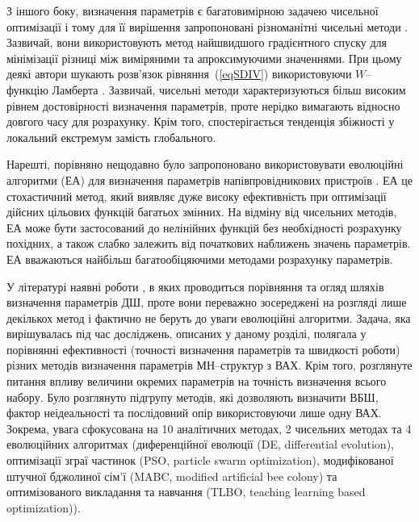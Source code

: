 З іншого боку, визначення параметрів є багатовимірною задачею чисельної оптимізації і тому для її вирішення запропоновані різноманітні чисельні методи \cite{Ortiz1999,Evangelou,Donoval,Ferhat}.
Зазвичай, вони використовують метод найшвидшого градієнтного спуску для мінімізації різниці між виміряними та апроксимуючими значеннями.
При цьому деякі автори\cite{Lambert_Jung,Ortiz2005} шукають розв'язок рівняння~(\ref{eqSDIV}) використовуючи $W$--функцію Ламберта
\cite{LambertBook}.
Зазвичай, чисельні методи характеризуються більш високим рівнем достовірності визначення параметрів, проте нерідко вимагають відносно довгого часу для розрахунку.
Крім того, спостерігається тенденція збіжності у локальний екстремум замість глобального.

Нарешті, порівняно нещодавно було запропоновано використовувати еволюційні алгоритми (ЕА) для визначення параметрів напівпровідникових пристроїв \cite{PSO_Ye,DEWang,GA_Li,P-DE_Ishaque,TLBO_Patel,MABC,PSOWang,GA_Schottky}.
ЕА це стохастичний метод, який виявляє дуже високу ефективність при оптимізації дійсних цільових функцій багатьох змінних.
На відміну від чисельних методів, ЕА може бути застосований до нелінійних функцій без необхідності розрахунку похідних, а також слабко залежить від початкових наближень значень параметрів.
ЕА вважаються \cite{P-DE_Ishaque} найбільш багатообіцяючими  методами розрахунку параметрів.

У літературі наявні роботи \cite{Evangelou,Aubry,Kudryk}, в яких проводиться порівняння  та огляд шляхів визначення параметрів ДШ, проте вони переважно зосереджені на розгляді лише декількох метод і фактично не беруть до уваги еволюційні алгоритми.
Задача, яка вирішувалась під час досліджень, описаних у даному розділі, полягала у порівнянні ефективності (точності визначення параметрів та швидкості роботи) різних методів визначення параметрів МН--структур з ВАХ.
Крім того, розглянуте питання впливу величини окремих параметрів на точність визначення всього набору.
Було розглянуто підгрупу методів, які дозволяють визначити ВБШ, фактор неідеальності та послідовний опір використовуючи лише одну ВАХ.
Зокрема, увага сфокусована на 10 аналітичних методах, 2 чисельних методах та 4 еволюційних алгоритмах
(диференційної еволюції (DE, differential evolution),
оптимізації зграї частинок (PSO, particle swarm optimization),
модифікованої штучної бджолиної сім'ї (MABC, modified artificial bee colony) та
оптимізованого викладання та навчання (TLBO, teaching learning based optimization)).



